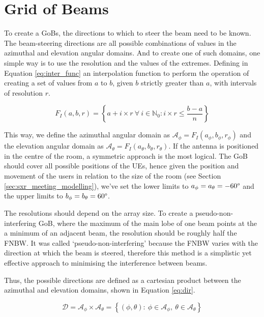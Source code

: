 \section{Grid of Beams}
\label{sec:GoB}


To create a GoBs, the directions to which to steer the beam need to be known. The beam-steering directions are all possible combinations of values in the azimuthal and elevation angular domains. And to create one of such domains, one simple way is to use the resolution and the values of the extremes. Defining in Equation \eqref{eq:inter_func} an interpolation function to perform the operation of creating a set of values from $a$ to $b$, given $b$ strictly greater than $a$, with intervals of resolution $r$.

\begin{equation} \label{eq:inter_func}
    F_I(a, b, r) = \left\{a + i \times r \  \forall \ i \in \mathbb{N}_0: i \times r \leq \frac{b-a}{n} \right\}
\end{equation}

This way, we define the azimuthal angular domain as $\mathcal{A}_\phi = F_I(a_\phi, b_\phi, r_\phi)$ and the elevation angular domain as $\mathcal{A}_\theta = F_I(a_\theta, b_\theta, r_\theta)$. If the antenna is positioned in the centre of the room, a symmetric approach is the most logical. The GoB should cover all possible positions of the UEs, hence given the position and movement of the users in relation to the size of the room (see Section \ref{sec:sxr_meeting_modelling}), we've set the lower limits to $a_\phi = a_\theta = -60\text{\textdegree}$ and the upper limits to $b_\phi = b_\theta = 60\text{\textdegree}$. 

The resolutions should depend on the array size. To create a pseudo-non-interfering GoB, where the maximum of the main lobe of one beam points at the a minimum of an adjacent beam, the resolution should be roughly half the \ac{FNBW}. It was called `pseudo-non-interfering' because the \ac{FNBW} varies with the direction at which the beam is steered, therefore this method is a simplistic yet effective approach to minimising the interference between beams. 

Thus, the possible directions are defined as a cartesian product between the azimuthal and elevation domains, shown in Equation \eqref{eq:dir}.

\begin{equation} \label{eq:dir}
    \mathcal{D} = \mathcal{A}_\phi \times \mathcal{A}_\theta = \left\{(\phi, \theta) : \ \phi \in \mathcal{A}_\phi , \ \theta \in \mathcal{A}_\theta\right\}
\end{equation}









